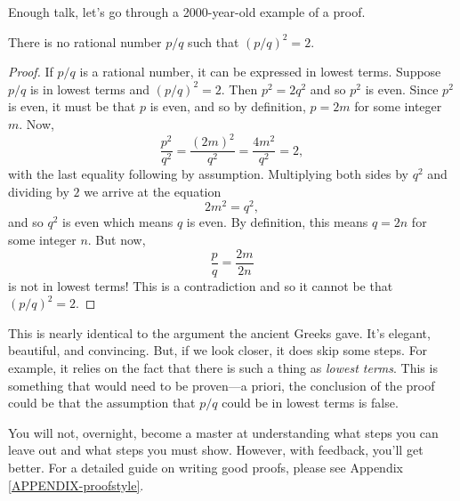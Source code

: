 	Enough talk, let's go through a 2000-year-old example of a proof.
	\begin{theorem}
		There is no rational number $p/q$ such that $(p/q)^2=2$.
	\end{theorem}
	\begin{proof}
		If $p/q$ is a rational number, it can be expressed
		in lowest terms.
		Suppose $p/q$ is in lowest terms and $(p/q)^2=2$.  Then $p^2=2q^2$ and so $p^2$ is even.  Since
		$p^2$ is even, it must be that $p$ is even, and so by definition,
		$p=2m$ for some integer $m$.  Now,
		\[
			\frac{p^2}{q^2}=\frac{(2m)^2}{q^2}=\frac{4m^2}{q^2}=2,
		\]
		with the last equality following by assumption.  Multiplying both sides by $q^2$
		and dividing by $2$ we arrive at the equation
		\[
			2m^2=q^2,
		\]
		and so $q^2$ is even which means $q$ is even.  By definition, this means $q=2n$ for some integer $n$.
		But now,
		\[
			\frac{p}{q}=\frac{2m}{2n}
		\]
		is not in lowest terms!  This is a contradiction and so it cannot be that $(p/q)^2=2$.
	\end{proof}
	This is nearly identical to the argument the ancient Greeks gave.  It's elegant, beautiful,
	and convincing.  But, if we look closer, it does skip some steps.  For example, it relies on
	the fact that there is such a thing as \emph{lowest terms}.  This is something that would
	need to be proven---a priori, the conclusion of the proof could be that the assumption
	that $p/q$ could be in lowest terms is false.  
	
	You will not, overnight,
	become a master at understanding
	what steps you can leave out and what steps you must show.  However, with feedback,
	you'll get better.
	For a detailed guide on writing good proofs, please see Appendix \ref{APPENDIX-proofstyle}.

